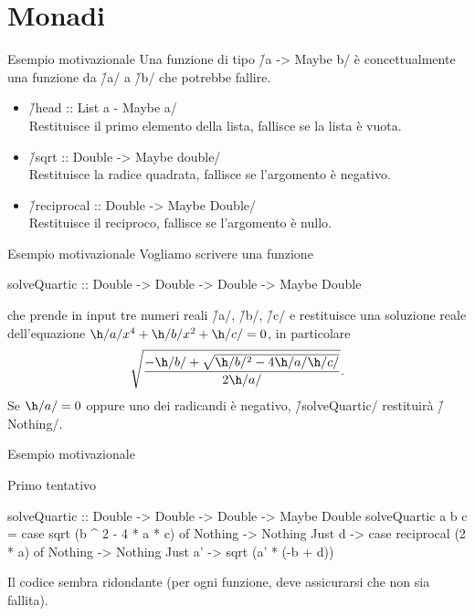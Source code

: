 \section*{Monadi}

\begin{frame}[fragile]{\secname}{Esempio motivazionale}
Una funzione di tipo \h/a -> Maybe b/ è concettualmente una funzione da \h/a/ a \h/b/ che potrebbe fallire.
\pause
\begin{itemize}[<+->]
\item \h/head :: List a - Maybe a/\\
Restituisce il primo elemento della lista, fallisce se la lista è vuota.
\item \h/sqrt :: Double -> Maybe double/\\
Restituisce la radice quadrata, fallisce se l'argomento è negativo.
\item \h/reciprocal :: Double -> Maybe Double/\\
Restituisce il reciproco, fallisce se l'argomento è nullo.
\end{itemize}
\end{frame}

\begin{frame}[fragile]{\secname}{Esempio motivazionale}
Vogliamo scrivere una funzione

\begin{haskellcode}
solveQuartic
    :: Double -> Double -> Double -> Maybe Double
\end{haskellcode}

che prende in input tre numeri reali \h/a/, \h/b/, \h/c/ e restituisce una soluzione reale dell'equazione $\h/a/x^4+\h/b/x^2+\h/c/=0$, in particolare
\[
\sqrt{\frac{-\h/b/+\sqrt{\h/b/^2-4\h/a/\h/c/}}{2\h/a/}}.
\]
\pause
Se $\h/a/=0$ oppure uno dei radicandi è negativo, \h/solveQuartic/ restituirà \h/Nothing/.
\end{frame}

\begin{frame}[fragile]{\secname}{Esempio motivazionale}
\begin{block}{Primo tentativo}
\begin{haskellcode}
solveQuartic
    :: Double -> Double -> Double -> Maybe Double
solveQuartic a b c =
    case sqrt (b ^ 2 - 4 * a * c) of
        Nothing -> Nothing
        Just d -> case reciprocal (2 * a) of
            Nothing -> Nothing
            Just a' -> sqrt (a' * (-b + d))
\end{haskellcode}
\pause

Il codice sembra ridondante (per ogni funzione, deve assicurarsi che non sia fallita).
\end{block}
\end{frame}

